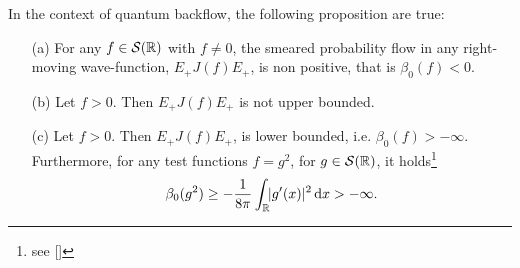 \begin{theorem}
	\label{th:ex_averaged_backflow}
	In the context of quantum backflow, the following proposition are true:
	\begin{itemize}
		\item[(a)] For any $f\in\mathcal{S}({\mathbb R})$ with $f\neq0$, the smeared probability flow in any right-moving wave-function, $E_+J(f)E_+$, is non positive, that is $\beta_0(f)<0$.
		\item[(b)]Let $f>0$. Then $E_+J(f)E_+$ is not upper bounded.
		\item[(c)]Let $f>0$. Then $E_+J(f)E_+$, is lower bounded, i.e. $\beta_0(f)>-\infty$. Furthermore, for any test functions $f=g^2$, for $g\in\mathcal{S}({\mathbb R})$, it holds\footnote{see [\citealp{verch}]}
		\begin{equation}
		\beta_0(g^2)\ge-\frac{1}{8\pi}\int_{{\mathbb R}}\!\! |g'(x)|^2\, \mathrm d x>-\infty.
		\label{eq:ineq_gsquare}
		\end{equation}
	\end{itemize}
\end{theorem}
